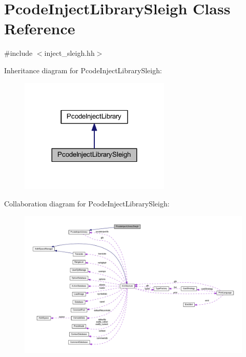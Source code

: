 \hypertarget{class_pcode_inject_library_sleigh}{}\section{Pcode\+Inject\+Library\+Sleigh Class Reference}
\label{class_pcode_inject_library_sleigh}


{\ttfamily \#include $<$inject\+\_\+sleigh.\+hh$>$}



Inheritance diagram for Pcode\+Inject\+Library\+Sleigh\+:
\nopagebreak
\begin{figure}[H]
\begin{center}
\leavevmode
\includegraphics[width=204pt]{class_pcode_inject_library_sleigh__inherit__graph}
\end{center}
\end{figure}


Collaboration diagram for Pcode\+Inject\+Library\+Sleigh\+:
\nopagebreak
\begin{figure}[H]
\begin{center}
\leavevmode
\includegraphics[width=350pt]{class_pcode_inject_library_sleigh__coll__graph}
\end{center}
\end{figure}
